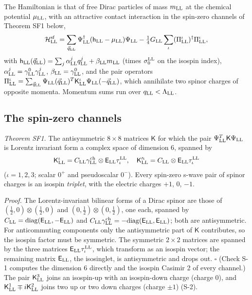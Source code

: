 The Hamiltonian is that of free Dirac particles of mass $m_{\rm LL}$ at the chemical potential $\mu_{\rm
LL}$, with an attractive contact interaction in the spin-zero channels of Theorem SF1 below,
\begin{equation}
\mathcal H^{\rm sf}_{\rm LL}=\sum_{\vec q_{\rm LL}}\Psi^\dagger_{\rm LL}(\mathsf h_{\rm LL}-\mu_{\rm LL})\Psi_{\rm LL}-\tfrac14G_{\rm LL}\sum_\iota(\Pi^\iota_{\rm LL})^\dagger\Pi^\iota_{\rm LL},
\label{eq:ham}
\end{equation}
with $\mathsf h_{\rm LL}(\vec q_{\rm LL})=\sum_j\alpha^j_{\rm LL}q^j_{\rm LL}+\beta_{\rm LL}m_{\rm LL}$
(times $\sigma^{\rm LL}_0$ on the isospin index), $\alpha^j_{\rm LL}=\gamma^0_{\rm LL}\gamma^j_{\rm LL}$,
$\beta_{\rm LL}=\gamma^0_{\rm LL}$, and the pair operators $\Pi^\iota_{\rm LL}=\sum_{\vec q_{\rm
LL}}\Psi_{\rm LL}(\vec q_{\rm LL})^T\mathsf K^\iota_{\rm LL}\Psi_{\rm LL}(-\vec q_{\rm LL})$, which annihilate
two spinor charges of opposite momenta. Momentum sums run over $q_{\rm LL}<\Lambda_{\rm LL}$.

\subsection{The spin-zero channels}

\noindent\emph{Theorem SF1.} The antisymmetric $8\times8$ matrices $\mathsf K$ for which the pair
$\Psi^T_{\rm LL}\mathsf K\Psi_{\rm LL}$ is Lorentz invariant form a complex space of dimension 6, spanned by
\begin{equation}
\mathsf K^\iota_{\rm LL}=C_{\rm LL}\gamma^{\rm ch}_{\rm LL}\otimes\mathsf E_{\rm LL}\tau^{\rm LL}_\iota,\quad \mathsf K'^\iota_{\rm LL}=C_{\rm LL}\otimes\mathsf E_{\rm LL}\tau^{\rm LL}_\iota
\label{eq:channels}
\end{equation}
($\iota=1,2,3$; scalar $0^+$ and pseudoscalar $0^-$). Every spin-zero s-wave pair of spinor charges is
an isospin \emph{triplet}, with the electric charges $+1$, $0$, $-1$.

\noindent\emph{Proof.} The Lorentz-invariant bilinear forms of a Dirac spinor are those of
$(\tfrac12,0)\otimes(\tfrac12,0)$ and $(0,\tfrac12)\otimes(0,\tfrac12)$, one each, spanned by $C_{\rm
LL}=\mathrm{diag}(\mathsf E_{\rm LL},-\mathsf E_{\rm LL})$ and $C_{\rm LL}\gamma^{\rm ch}_{\rm
LL}=-\mathrm{diag}(\mathsf E_{\rm LL},\mathsf E_{\rm LL})$; both are antisymmetric. For anticommuting
components only the antisymmetric part of $\mathsf K$ contributes, so the isospin factor must be
symmetric. The symmetric $2\times2$ matrices are spanned by the three matrices $\mathsf E_{\rm
LL}\tau^{\rm LL}_\iota$, which transform as an isospin vector; the remaining matrix $\mathsf E_{\rm LL}$,
the isosinglet, is antisymmetric and drops out. $\square$ (Check S-1 computes the dimension 6 directly and
the isospin Casimir 2 of every channel.) The pair $\mathsf K^3_{\rm LL}$ joins an isospin-up with an
isospin-down charge (charge 0), and $\mathsf K^1_{\rm LL}\mp i\mathsf K^2_{\rm LL}$ joins two up or two
down charges (charge $\pm1$) (S-2).

